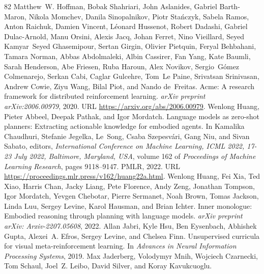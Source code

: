 \documentclass{article}
\begin{document}
\begin{thebibliography}{82}
Matthew~W. Hoffman, Bobak Shahriari, John Aslanides, Gabriel Barth-Maron, Nikola Momchev, Danila Sinopalnikov, Piotr Sta\'nczyk, Sabela Ramos, Anton Raichuk, Damien Vincent, L\'eonard Hussenot, Robert Dadashi, Gabriel Dulac-Arnold, Manu Orsini, Alexis Jacq, Johan Ferret, Nino Vieillard, Seyed Kamyar~Seyed Ghasemipour, Sertan Girgin, Olivier Pietquin, Feryal Behbahani, Tamara Norman, Abbas Abdolmaleki, Albin Cassirer, Fan Yang, Kate Baumli, Sarah Henderson, Abe Friesen, Ruba Haroun, Alex Novikov, Sergio~G\'omez Colmenarejo, Serkan Cabi, Caglar Gulcehre, Tom~Le Paine, Srivatsan Srinivasan, Andrew Cowie, Ziyu Wang, Bilal Piot, and Nando de~Freitas.
\newblock Acme: A research framework for distributed reinforcement learning.
\newblock \emph{arXiv preprint arXiv:2006.00979}, 2020.
\newblock URL \url{https://arxiv.org/abs/2006.00979}.
Wenlong Huang, Pieter Abbeel, Deepak Pathak, and Igor Mordatch.
\newblock Language models as zero-shot planners: Extracting actionable knowledge for embodied agents.
\newblock In Kamalika Chaudhuri, Stefanie Jegelka, Le~Song, Csaba Szepesv{\'{a}}ri, Gang Niu, and Sivan Sabato, editors, \emph{International Conference on Machine Learning, {ICML} 2022, 17-23 July 2022, Baltimore, Maryland, {USA}}, volume 162 of \emph{Proceedings of Machine Learning Research}, pages 9118--9147. {PMLR}, 2022{}.
\newblock URL \url{https://proceedings.mlr.press/v162/huang22a.html}.
Wenlong Huang, Fei Xia, Ted Xiao, Harris Chan, Jacky Liang, Pete Florence, Andy Zeng, Jonathan Tompson, Igor Mordatch, Yevgen Chebotar, Pierre Sermanet, Noah Brown, Tomas Jackson, Linda Luu, Sergey Levine, Karol Hausman, and Brian Ichter.
\newblock Inner monologue: Embodied reasoning through planning with language models.
\newblock \emph{arXiv preprint arXiv: Arxiv-2207.05608}, 2022{}.
Allan Jabri, Kyle Hsu, Ben Eysenbach, Abhishek Gupta, Alexei~A. Efros, Sergey Levine, and Chelsea Finn.
\newblock Unsupervised curricula for visual meta-reinforcement learning.
\newblock In \emph{Advances in Neural Information Processing Systems}, 2019.
Max Jaderberg, Volodymyr Mnih, Wojciech Czarnecki, Tom Schaul, Joel~Z. Leibo, David Silver, and Koray Kavukcuoglu.

\end{thebibliography}
\end{document}
